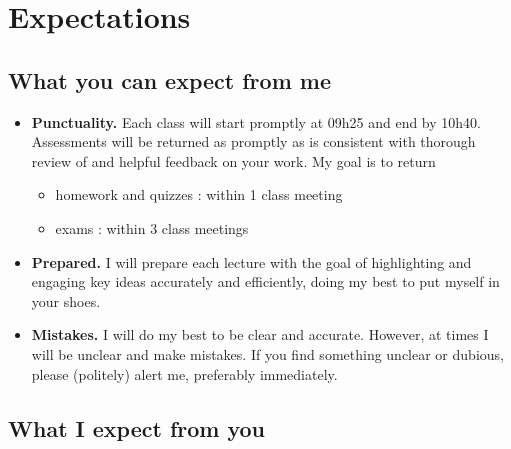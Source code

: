 \section{Expectations}

\subsection{What you can expect from me}

\begin{itemize}
\item \textbf{Punctuality.} Each class will start promptly at 09h25 and end by 10h40. Assessments will be returned as promptly as is consistent with thorough review of and helpful feedback on your work. My goal is to return
\begin{itemize}
\item homework and quizzes : within 1 class meeting
\item exams : within 3 class meetings
\end{itemize}
\item \textbf{Prepared.} I will prepare each lecture with the goal of highlighting and engaging key ideas accurately and efficiently, doing my best to put myself in your shoes.
\item \textbf{Mistakes.} I will do my best to be clear and accurate. However, at times I will be unclear and make mistakes. If you find something unclear or dubious, please (politely) alert me, preferably immediately.
\end{itemize}



\subsection{What I expect from you}

